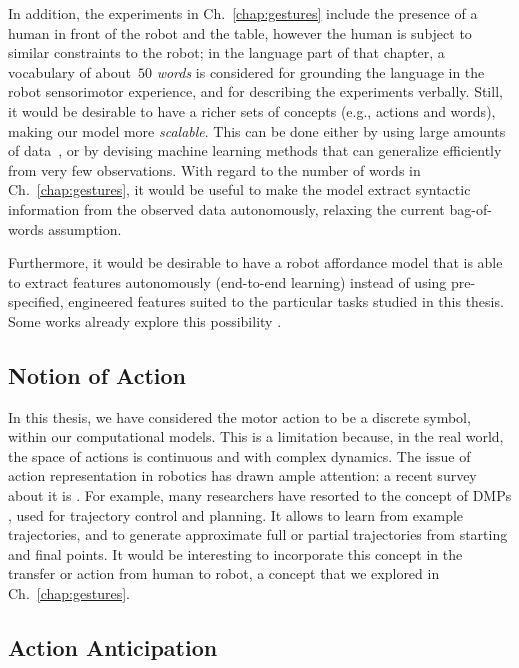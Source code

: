 In addition, the experiments in Ch.~\ref{chap:gestures} include the presence of a human in front of the robot and the table, however the human is subject to similar constraints to the robot; in the language part of that chapter, a vocabulary of about~$50$ \emph{words} is considered for grounding the language in the robot sensorimotor experience, and for describing the experiments verbally.
Still, it would be desirable to have a richer sets of concepts (e.g., actions and words), making our model more \emph{scalable}.
This can be done either by using large amounts of data~\cite{levine:2018:ijrr}, or by devising machine learning methods that can generalize efficiently from very few observations. With regard to the number of words in Ch.~\ref{chap:gestures}, it would be useful to make the model extract syntactic information from the observed data autonomously, relaxing the current bag-of-words assumption.

Furthermore, it would be desirable to have a robot affordance model that is able to extract features autonomously (end-to-end learning) instead of using pre-specified, engineered features suited to the particular tasks studied in this thesis.
Some works already explore this possibility \cite{dehban:2016:icra,dehban:2017:humanoids}.

\subsection{Notion of Action}

In this thesis, we have considered the motor action to be a discrete symbol, within our computational models.
This is a limitation because, in the real world, the space of actions is continuous and with complex dynamics.
The issue of action representation in robotics has drawn ample attention: a recent survey about it is \cite{zech:2019:ijrr}.
For example, many researchers have resorted to the concept of \acp{DMP} \cite{schaal:2006:dmp}, used for trajectory control and planning.
It allows to learn from example trajectories, and to generate approximate full or partial trajectories from starting and final points.
It would be interesting to incorporate this concept in the transfer or action from human to robot, a concept that we explored in Ch.~\ref{chap:gestures}.

\subsection{Action Anticipation}

